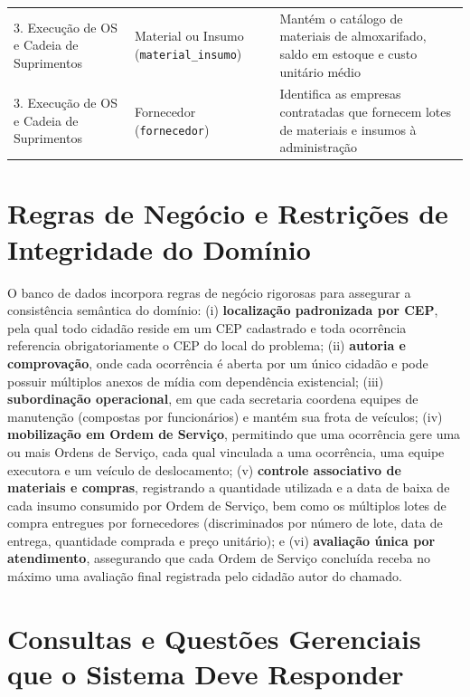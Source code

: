 \begin{table}[htb]
\begin{tabular}{L{3.2cm} L{4.2cm} L{7.0cm}}
3. Execução de OS e Cadeia de Suprimentos & Material ou Insumo (\texttt{material\_insumo}) & Mantém o catálogo de materiais de almoxarifado, saldo em estoque e custo unitário médio \\
3. Execução de OS e Cadeia de Suprimentos & Fornecedor (\texttt{fornecedor}) & Identifica as empresas contratadas que fornecem lotes de materiais e insumos à administração \\
\bottomrule
\end{tabular}
\end{table}

\section{Regras de Negócio e Restrições de Integridade do Domínio}
\label{sec:regras-negocio}

O banco de dados incorpora regras de negócio rigorosas para assegurar a consistência semântica do domínio: (i) \textbf{localização padronizada por CEP}, pela qual todo cidadão reside em um CEP cadastrado e toda ocorrência referencia obrigatoriamente o CEP do local do problema; (ii) \textbf{autoria e comprovação}, onde cada ocorrência é aberta por um único cidadão e pode possuir múltiplos anexos de mídia com dependência existencial; (iii) \textbf{subordinação operacional}, em que cada secretaria coordena equipes de manutenção (compostas por funcionários) e mantém sua frota de veículos; (iv) \textbf{mobilização em Ordem de Serviço}, permitindo que uma ocorrência gere uma ou mais Ordens de Serviço, cada qual vinculada a uma ocorrência, uma equipe executora e um veículo de deslocamento; (v) \textbf{controle associativo de materiais e compras}, registrando a quantidade utilizada e a data de baixa de cada insumo consumido por Ordem de Serviço, bem como os múltiplos lotes de compra entregues por fornecedores (discriminados por número de lote, data de entrega, quantidade comprada e preço unitário); e (vi) \textbf{avaliação única por atendimento}, assegurando que cada Ordem de Serviço concluída receba no máximo uma avaliação final registrada pelo cidadão autor do chamado.

\section{Consultas e Questões Gerenciais que o Sistema Deve Responder}
\label{sec:consultas-sistema}

